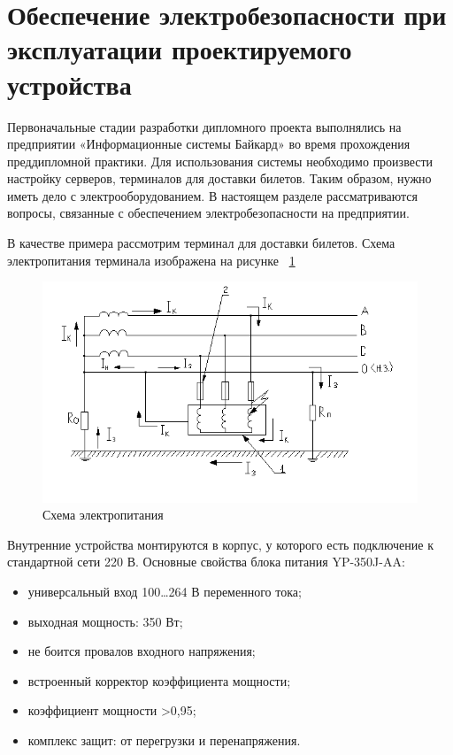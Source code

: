\section{Обеспечение электробезопасности при эксплуатации проектируемого устройства}

Первоначальные стадии разработки дипломного проекта выполнялись на предприятии «Информационные системы Байкард» во время прохождения преддипломной практики. Для использования системы необходимо произвести настройку серверов, терминалов для доставки билетов. Таким образом, нужно иметь дело с электрооборудованием. В настоящем разделе рассматриваются вопросы, связанные с обеспечением электробезопасности на предприятии.

В качестве примера рассмотрим терминал для доставки билетов. Схема электропитания терминала изображена на рисунке ~\ref{ot-el-schema}

\begin{figure}
  	\label{ot-el-schema}
  	\centering
  	\includegraphics[width=1\textwidth]{images/ot-el-schema.png}
  	\caption{Схема электропитания}
\end{figure}

Внутренние устройства монтируются в корпус, у которого есть подключение к стандартной сети 220 В. Основные свойства блока питания YP-350J-AA:

\begin{itemize}
    \item универсальный вход 100…264 В переменного тока; 
    \item выходная мощность: 350 Вт; 
    \item не боится провалов входного напряжения; 
    \item встроенный корректор коэффициента мощности; 
    \item коэффициент мощности >0,95; 
    \item комплекс защит: от перегрузки и перенапряжения.
\end{itemize}

